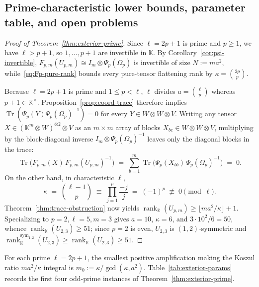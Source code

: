 \documentclass[11pt,reqno]{amsart}
\theoremstyle{definition}
\theoremstyle{remark}
\numberwithin{equation}{section}
\newcommand{\KK}{\mathbb{K}}
\DeclareMathOperator{\rk}{rank}
\DeclareMathOperator{\Tr}{Tr}
\begin{document}
\subsection{Prime-characteristic lower bounds, parameter table, and open problems}

\begin{proof}[Proof of Theorem~\ref{thm:exterior-prime}]
Since $\ell = 2p + 1$ is prime and $p \ge 1$, we have $\ell > p + 1$, so $1, \dots, p + 1$ are invertible in $\KK$. By Corollary~\ref{cor:psi-invertible}, $F_{p,m}(U_{p,m}) \cong I_m \otimes \Psi_p(\Omega_p)$ is invertible of size $N := m a^2$, while~\eqref{eq:Fp-pure-rank} bounds every pure-tensor flattening rank by $\kappa = \binom{2p}{p}$.

Because $\ell = 2p + 1$ is prime and $1 \le p < \ell$, $\ell$ divides $a = \binom{\ell}{p}$ whereas $p + 1 \in \KK^\times$. Proposition~\ref{prop:coord-trace} therefore implies $\Tr(\Psi_p(Y)\Psi_p(\Omega_p)^{-1}) = 0$ for every $Y \in W \otimes W \otimes V$. Writing any tensor $X \in (\KK^m \otimes W)^{\otimes 2} \otimes V$ as an $m \times m$ array of blocks $X_{bc} \in W \otimes W \otimes V$, multiplying by the block-diagonal inverse $I_m \otimes \Psi_p(\Omega_p)^{-1}$ leaves only the diagonal blocks in the trace:
\[
  \Tr\bigl(F_{p,m}(X)\, F_{p,m}(U_{p,m})^{-1}\bigr) \;=\; \sum_{b=1}^m \Tr\bigl(\Psi_p(X_{bb})\,\Psi_p(\Omega_p)^{-1}\bigr) \;=\; 0.
\]
On the other hand, in characteristic $\ell$,
\[
  \kappa \;=\; \binom{\ell - 1}{p} \;\equiv\; \prod_{j=1}^p \frac{-j}{j} \;=\; (-1)^p \;\not\equiv\; 0 \pmod{\ell}.
\]
Theorem~\ref{thm:trace-obstruction} now yields $\rk_{\KK}(U_{p,m}) \ge \lfloor m a^2 / \kappa \rfloor + 1$. Specializing to $p = 2, \ell = 5, m = 3$ gives $a = 10$, $\kappa = 6$, and $3 \cdot 10^2 / 6 = 50$, whence $\rk_{\KK}(U_{2,3}) \ge 51$; since $p = 2$ is even, $U_{2,3}$ is $(1,2)$-symmetric and $\rk_{\KK}^{\mathrm{sym}_{1,2}}(U_{2,3}) \ge \rk_{\KK}(U_{2,3}) \ge 51$.
\end{proof}

For each prime $\ell = 2p + 1$, the smallest positive amplification making the Koszul ratio $m a^2 / \kappa$ integral is $m_0 := \kappa / \gcd(\kappa, a^2)$. Table~\ref{tab:exterior-params} records the first four odd-prime instances of Theorem~\ref{thm:exterior-prime}.
\end{document}
